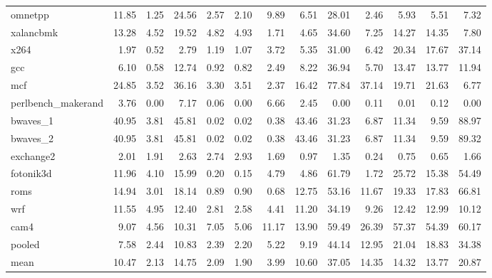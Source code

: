 \documentclass[10pt,a4paper]{article}
\begin{document}
{\begin{longtable}{@{}lrrrrrrrrrrrr@{}}
omnetpp & 11.85 & 1.25 & 24.56 & 2.57 & 2.10 & 9.89 & 6.51 & 28.01 & 2.46 & 5.93 & 5.51 & 7.32 \\
xalancbmk & 13.28 & 4.52 & 19.52 & 4.82 & 4.93 & 1.71 & 4.65 & 34.60 & 7.25 & 14.27 & 14.35 & 7.80 \\
x264 & 1.97 & 0.52 & 2.79 & 1.19 & 1.07 & 3.72 & 5.35 & 31.00 & 6.42 & 20.34 & 17.67 & 37.14 \\
gcc & 6.10 & 0.58 & 12.74 & 0.92 & 0.82 & 2.49 & 8.22 & 36.94 & 5.70 & 13.47 & 13.77 & 11.94 \\
mcf & 24.85 & 3.52 & 36.16 & 3.30 & 3.51 & 2.37 & 16.42 & 77.84 & 37.14 & 19.71 & 21.63 & 6.77 \\
perlbench\_makerand & 3.76 & 0.00 & 7.17 & 0.06 & 0.00 & 6.66 & 2.45 & 0.00 & 0.11 & 0.01 & 0.12 & 0.00 \\
bwaves\_1 & 40.95 & 3.81 & 45.81 & 0.02 & 0.02 & 0.38 & 43.46 & 31.23 & 6.87 & 11.34 & 9.59 & 88.97 \\
bwaves\_2 & 40.95 & 3.81 & 45.81 & 0.02 & 0.02 & 0.38 & 43.46 & 31.23 & 6.87 & 11.34 & 9.59 & 89.32 \\
exchange2 & 2.01 & 1.91 & 2.63 & 2.74 & 2.93 & 1.69 & 0.97 & 1.35 & 0.24 & 0.75 & 0.65 & 1.66 \\
fotonik3d & 11.96 & 4.10 & 15.99 & 0.20 & 0.15 & 4.79 & 4.86 & 61.79 & 1.72 & 25.72 & 15.38 & 54.49 \\
roms & 14.94 & 3.01 & 18.14 & 0.89 & 0.90 & 0.68 & 12.75 & 53.16 & 11.67 & 19.33 & 17.83 & 66.81 \\
wrf & 11.55 & 4.95 & 12.40 & 2.81 & 2.58 & 4.41 & 11.20 & 34.19 & 9.26 & 12.42 & 12.99 & 10.12 \\
cam4 & 9.07 & 4.56 & 10.31 & 7.05 & 5.06 & 11.17 & 13.90 & 59.49 & 26.39 & 57.37 & 54.39 & 60.17 \\
\midrule
pooled & 7.58 & 2.44 & 10.83 & 2.39 & 2.20 & 5.22 & 9.19 & 44.14 & 12.95 & 21.04 & 18.83 & 34.38 \\
mean & 10.47 & 2.13 & 14.75 & 2.09 & 1.90 & 3.99 & 10.60 & 37.05 & 14.35 & 14.32 & 13.77 & 20.87 \\
\end{longtable}
}
\end{document}
